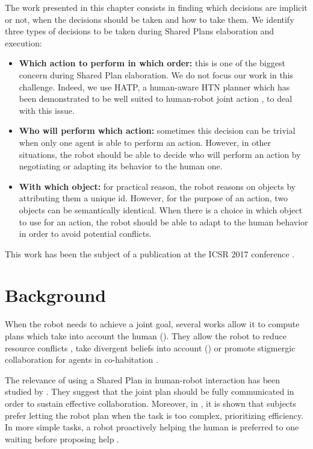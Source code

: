 \documentclass[english,a4paper,11pt,twoside]{StyleThese}
\begin{document}
The work presented in this chapter consists in finding which decisions are implicit or not, when the decisions should be taken and how to take them. We identify three types of decisions to be taken during Shared Plans elaboration and execution:
\begin{itemize}
\item \textbf{Which action to perform in which order:} this is one of the biggest concern during Shared Plan elaboration. We do not focus our work in this challenge. Indeed, we use HATP, a human-aware HTN planner which has been demonstrated to be well suited to human-robot joint action \cite{Lallement2014hatp}, to deal with this issue.
\item \textbf{Who will perform which action:} sometimes this decision can be trivial when only one agent is able to perform an action. However, in other situations, the robot should be able to decide who will perform an action by negotiating or adapting its behavior to the human one.
\item \textbf{With which object:} for practical reason, the robot reasons on objects by attributing them a unique id. However, for the purpose of an action, two objects can be semantically identical. When there is a choice in which object to use for an action, the robot should be able to adapt to the human behavior in order to avoid potential conflicts.
\end{itemize}
This work has been the subject of a publication at the ICSR 2017 conference \cite{devin2017about}.

\section{Background}

When the robot needs to achieve a joint goal, several works allow it to compute plans which take into account the human (\cite{cirillo2010human,Lallement2014hatp}). They allow the robot to reduce resource conflicts \cite{chakraborti2016planning}, take divergent beliefs into account (\cite{warnier2012robot,talamadupula2014coordination}) or promote stigmergic collaboration
for agents in co-habitation \cite{chakraborti2015planning}. 

The relevance of using a Shared Plan in human-robot interaction has been studied by \cite{lallee2013cooperative}. They suggest that the joint plan should be fully communicated in order to sustain effective collaboration. Moreover, in \cite{gombolay2015decision}, it is shown that subjects prefer letting the robot plan when the task is too complex, prioritizing efficiency. 
In more simple tasks, a robot proactively helping the human is preferred to one waiting before proposing help \cite{baraglia2016initiative}. 
\end{document}
